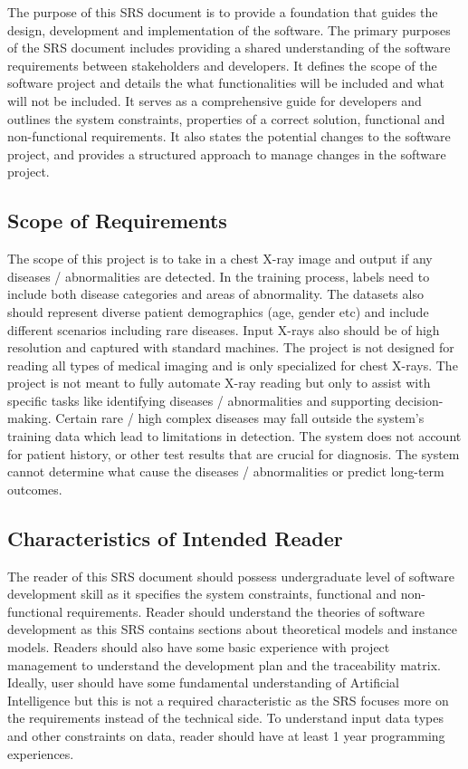 \documentclass[12pt]{article}
\begin{document}
The purpose of this SRS document is to provide a foundation that guides the design, development and implementation of the software. The primary purposes of the SRS document includes providing a shared understanding of the software requirements between stakeholders and developers. It defines the scope of the software project and details the what functionalities will be included and what will not be included. It serves as a comprehensive guide for developers and outlines the system constraints, properties of a correct solution, functional and non-functional requirements. It also states the potential changes to the software project, and provides a structured approach to manage changes in the software project.\\

\subsection{Scope of Requirements} 

The scope of this project is to take in a chest X-ray image and output if any diseases / abnormalities are detected. In the training process, labels need to include both disease categories and areas of abnormality. The datasets also should represent diverse patient demographics (age, gender etc) and include different scenarios including rare diseases. Input X-rays also should be of high resolution and captured with standard machines. The project is not designed for reading all types of medical imaging and is only specialized for chest X-rays. The project is not meant to fully automate X-ray reading but only to assist with specific tasks like identifying diseases / abnormalities and supporting decision-making. Certain rare / high complex diseases may fall outside the system's training data which lead to limitations in detection. The system does not account for patient history, or other test results that are crucial for diagnosis. The system cannot determine what cause the diseases / abnormalities or predict long-term outcomes. \\

\subsection{Characteristics of Intended Reader} \label{sec_IntendedReader}

The reader of this SRS document should possess undergraduate level of software development skill as it specifies the system constraints, functional and non-functional requirements. Reader should understand the theories of software development as this SRS contains sections about theoretical models and instance models. Readers should also have some basic experience with project management to understand the development plan and the traceability matrix. Ideally, user should have some fundamental understanding of Artificial Intelligence but this is not a required characteristic as the SRS focuses more on the requirements instead of the technical side. To understand input data types and other constraints on data, reader should have at least 1 year programming experiences.\\
\end{document}
